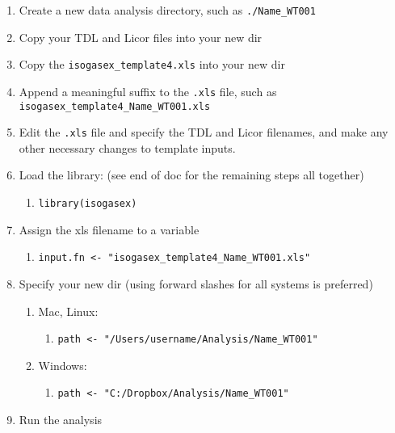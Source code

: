 \documentclass[]{article}
\providecommand{\tightlist}{%
  \setlength{\itemsep}{0pt}\setlength{\parskip}{0pt}}
\begin{document}
\begin{enumerate}
\def\labelenumi{\arabic{enumi}.}
\item
  Create a new data analysis directory, such as \texttt{./Name\_WT001}
\item
  Copy your TDL and Licor files into your new dir
\item
  Copy the \texttt{isogasex\_template4.xls} into your new dir
\item
  Append a meaningful suffix to the \texttt{.xls} file, such as
  \texttt{isogasex\_template4\_Name\_WT001.xls}
\item
  Edit the \texttt{.xls} file and specify the TDL and Licor filenames,
  and make any other necessary changes to template inputs.
\item
  Load the library: (see end of doc for the remaining steps all
  together)

  \begin{enumerate}
  \def\labelenumii{\arabic{enumii}.}
  \tightlist
  \item
    \texttt{library(isogasex)}
  \end{enumerate}
\item
  Assign the xls filename to a variable

  \begin{enumerate}
  \def\labelenumii{\arabic{enumii}.}
  \tightlist
  \item
    \texttt{input.fn\ \textless{}-\ "isogasex\_template4\_Name\_WT001.xls"}
  \end{enumerate}
\item
  Specify your new dir (using forward slashes for all systems is
  preferred)

  \begin{enumerate}
  \def\labelenumii{\arabic{enumii}.}
  \item
    Mac, Linux:

    \begin{enumerate}
    \def\labelenumiii{\arabic{enumiii}.}
    \tightlist
    \item
      \texttt{path\ \textless{}-\ "/Users/username/Analysis/Name\_WT001"}
    \end{enumerate}
  \item
    Windows:

    \begin{enumerate}
    \def\labelenumiii{\arabic{enumiii}.}
    \tightlist
    \item
      \texttt{path\ \textless{}-\ "C:/Dropbox/Analysis/Name\_WT001"}
    \end{enumerate}
  \end{enumerate}
\item
  Run the analysis


\end{enumerate}
\end{document}
